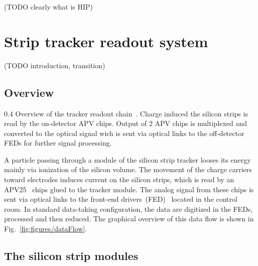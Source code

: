 (TODO clearly what is HIP)

\section{Strip tracker readout system}

(TODO introduction, transition)

\subsection{Overview}

                 {0.4}       %
                 {Overview of the tracker readout chain~\cite{Bainbridge:2004jc}. Charge induced the silicon strips is read by the on-detector APV chips. Output of 2 APV chips is multiplexed and converted to the optical signal wich is sent via optical links to the off-detector FEDs for further signal processing. } %

A particle passing through a module of the silicon strip tracker looses its energy mainly via ionization of the silicon volume. The movement of the charge carriers toward electrodes induces current on the silicon strips, which is read by an APV25~\cite{French:2001xb} chips glued to the tracker module. The analog signal from these chips is sent via optical links to the front-end drivers~(FED)~\cite{Baird:2002wg} located in the control room. In standard data-taking configuration, the data are digitized in the FEDs, processed and then reduced. The graphical overview of this data flow is shown in Fig.~\ref{fig:figures/dataFlow}.

\subsection{The silicon strip modules}


